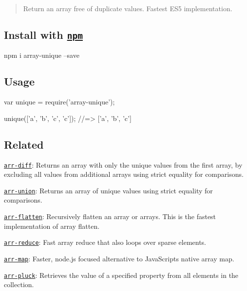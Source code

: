 \begin{quote}
Return an array free of duplicate values. Fastest E\+S5 implementation. \end{quote}


\subsection*{Install with \href{npmjs.org}{\tt npm}}


\begin{DoxyCode}
npm i array-unique --save
\end{DoxyCode}


\subsection*{Usage}


\begin{DoxyCode}
var unique = require('array-unique');

unique(['a', 'b', 'c', 'c']);
//=> ['a', 'b', 'c']
\end{DoxyCode}


\subsection*{Related}


\begin{DoxyItemize}
\item \href{https://github.com/jonschlinkert/arr-diff}{\tt arr-\/diff}\+: Returns an array with only the unique values from the first array, by excluding all values from additional arrays using strict equality for comparisons.
\item \href{https://github.com/jonschlinkert/arr-union}{\tt arr-\/union}\+: Returns an array of unique values using strict equality for comparisons.
\item \href{https://github.com/jonschlinkert/arr-flatten}{\tt arr-\/flatten}\+: Recursively flatten an array or arrays. This is the fastest implementation of array flatten.
\item \href{https://github.com/jonschlinkert/arr-reduce}{\tt arr-\/reduce}\+: Fast array reduce that also loops over sparse elements.
\item \href{https://github.com/jonschlinkert/arr-map}{\tt arr-\/map}\+: Faster, node.\+js focused alternative to Java\+Script\textquotesingle{}s native array map.
\item \href{https://github.com/jonschlinkert/arr-pluck}{\tt arr-\/pluck}\+: Retrieves the value of a specified property from all elements in the collection.
\end{DoxyItemize}

